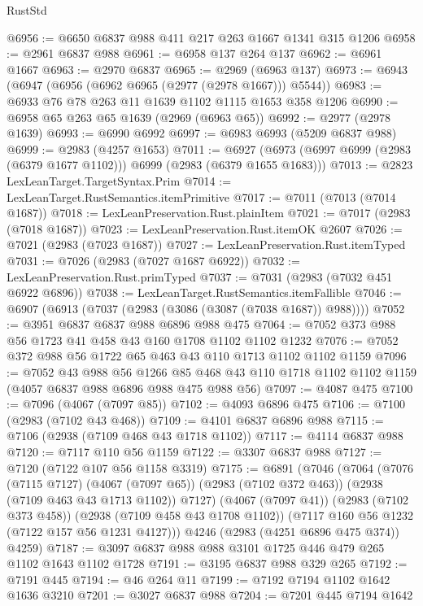\begin{lexlean}{RustStd}
\begin{coremodule}
@6956 := @6650 @6837 @988 @411 @217 @263 @1667 @1341 @315 @1206
@6958 := @2961 @6837 @988
@6961 := @6958 @137 @264 @137
@6962 := @6961 @1667
@6963 := @2970 @6837
@6965 := @2969 (@6963 @137)
@6973 := @6943 (@6947 (@6956 (@6962 @6965 (@2977 (@2978 @1667))) @5544))
@6983 := @6933 @76 @78 @263 @11 @1639 @1102 @1115 @1653 @358 @1206
@6990 := @6958 @65 @263 @65 @1639 (@2969 (@6963 @65))
@6992 := @2977 (@2978 @1639)
@6993 := @6990 @6992
@6997 := @6983 @6993 (@5209 @6837 @988)
@6999 := @2983 (@4257 @1653)
@7011 := @6927 (@6973 (@6997 @6999 (@2983 (@6379 @1677 @1102))) @6999 (@2983 (@6379 @1655 @1683)))
@7013 := @2823 LexLeanTarget.TargetSyntax.Prim
@7014 := LexLeanTarget.RustSemantics.itemPrimitive
@7017 := @7011 (@7013 (@7014 @1687))
@7018 := LexLeanPreservation.Rust.plainItem
@7021 := @7017 (@2983 (@7018 @1687))
@7023 := LexLeanPreservation.Rust.itemOK @2607
@7026 := @7021 (@2983 (@7023 @1687))
@7027 := LexLeanPreservation.Rust.itemTyped
@7031 := @7026 (@2983 (@7027 @1687 @6922))
@7032 := LexLeanPreservation.Rust.primTyped
@7037 := @7031 (@2983 (@7032 @451 @6922 @6896))
@7038 := LexLeanTarget.RustSemantics.itemFallible
@7046 := @6907 (@6913 (@7037 (@2983 (@3086 (@3087 (@7038 @1687)) @988))))
@7052 := @3951 @6837 @6837 @988 @6896 @988 @475
@7064 := @7052 @373 @988 @56 @1723 @41 @458 @43 @160 @1708 @1102 @1102 @1232
@7076 := @7052 @372 @988 @56 @1722 @65 @463 @43 @110 @1713 @1102 @1102 @1159
@7096 := @7052
    @43
    @988
    @56
    @1266
    @85
    @468
    @43
    @110
    @1718
    @1102
    @1102
    @1159
    (@4057 @6837 @988 @6896 @988 @475 @988 @56)
@7097 := @4087 @475
@7100 := @7096 (@4067 (@7097 @85))
@7102 := @4093 @6896 @475
@7106 := @7100 (@2983 (@7102 @43 @468))
@7109 := @4101 @6837 @6896 @988
@7115 := @7106 (@2938 (@7109 @468 @43 @1718 @1102))
@7117 := @4114 @6837 @988
@7120 := @7117 @110 @56 @1159
@7122 := @3307 @6837 @988
@7127 := @7120 (@7122 @107 @56 @1158 @3319)
@7175 := @6891
    (@7046
      (@7064
        (@7076
          (@7115 @7127)
          (@4067 (@7097 @65))
          (@2983 (@7102 @372 @463))
          (@2938 (@7109 @463 @43 @1713 @1102))
          @7127)
        (@4067 (@7097 @41))
        (@2983 (@7102 @373 @458))
        (@2938 (@7109 @458 @43 @1708 @1102))
        (@7117 @160 @56 @1232 (@7122 @157 @56 @1231 @4127)))
      @4246
      (@2983 (@4251 @6896 @475 @374))
      @4259)
@7187 := @3097 @6837 @988 @988 @3101 @1725 @446 @479 @265 @1102 @1643 @1102 @1728
@7191 := @3195 @6837 @988 @329 @265
@7192 := @7191 @445
@7194 := @46 @264 @11
@7199 := @7192 @7194 @1102 @1642 @1636 @3210
@7201 := @3027 @6837 @988
@7204 := @7201 @445 @7194 @1642

\end{coremodule}
\end{lexlean}
